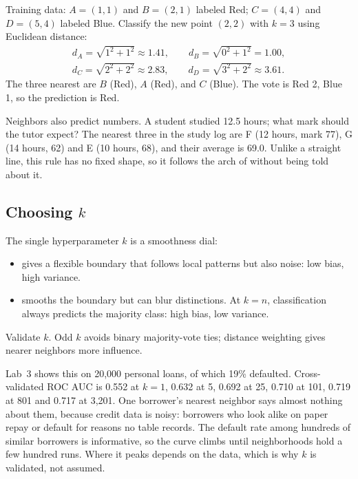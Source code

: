 \begin{workedexample}
Training data: $A=(1,1)$ and $B=(2,1)$ labeled Red; $C=(4,4)$ and $D=(5,4)$ labeled Blue. Classify the new point $(2,2)$ with $k=3$ using Euclidean distance:
\begin{gather*}
  d_A=\sqrt{1^2+1^2}\approx 1.41,\qquad
  d_B=\sqrt{0^2+1^2}=1.00,\\
  d_C=\sqrt{2^2+2^2}\approx 2.83,\qquad
  d_D=\sqrt{3^2+2^2}\approx 3.61.
\end{gather*}
The three nearest are $B$ (Red), $A$ (Red), and $C$ (Blue). The vote is Red 2, Blue 1, so the prediction is Red.
\end{workedexample}

\begin{workedexample}
Neighbors also predict numbers. A student studied 12.5 hours; what mark should the tutor expect? The nearest three in the study log are F (12 hours, mark 77), G (14 hours, 62) and E (10 hours, 68), and their average is 69.0. Unlike a straight line, this rule has no fixed shape, so it follows the arch of  without being told about it.
\end{workedexample}

\subsection{Choosing $k$}

The single hyperparameter $k$ is a smoothness dial:

\begin{itemize}
  \item {} gives a flexible boundary that follows local patterns but also noise: low bias, high variance.
  \item {} smooths the boundary but can blur distinctions. At $k=n$, classification always predicts the majority class: high bias, low variance.
\end{itemize}

Validate $k$. Odd $k$ avoids binary majority-vote ties; distance weighting gives nearer neighbors more influence.

Lab~3 shows this on 20,000 personal loans, of which 19\% defaulted. Cross-validated ROC AUC is 0.552 at $k=1$, 0.632 at 5, 0.692 at 25, 0.710 at 101, 0.719 at 801 and 0.717 at 3,201. One borrower's nearest neighbor says almost nothing about them, because credit data is noisy: borrowers who look alike on paper repay or default for reasons no table records. The default rate among hundreds of similar borrowers is informative, so the curve climbs until neighborhoods hold a few hundred runs. Where it peaks depends on the data, which is why $k$ is validated, not assumed.

